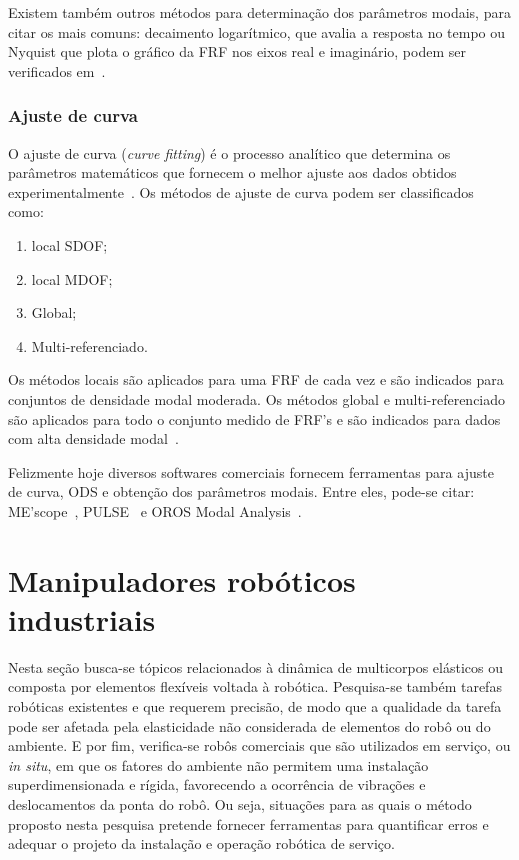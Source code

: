 Existem também outros métodos para determinação dos parâmetros modais, para
citar os mais comuns:
decaimento logarítmico, que avalia a resposta no tempo ou Nyquist que plota o
gráfico da FRF nos eixos real e imaginário, podem ser
verificados em~\cite{rao2011mechanical}.

\subsubsection{Ajuste de curva}

O ajuste de curva (\textit{curve fitting}) é o processo analítico que determina
os parâmetros matemáticos que fornecem o melhor ajuste aos dados
obtidos experimentalmente~\cite{dossing1988structural}.
Os métodos de ajuste de curva podem ser classificados como: 
%
\begin{enumerate}[label=\emph{\alph*})]
	\item local SDOF;
	\item local MDOF;
	\item Global;
	\item Multi-referenciado.
\end{enumerate}
%
Os métodos locais são aplicados para uma FRF de cada vez e são indicados para
conjuntos de densidade modal moderada. Os métodos global e multi-referenciado
são aplicados para todo o conjunto medido de FRF's e são indicados para dados
com alta densidade modal~\cite{schwarz1999experimental}. 

Felizmente hoje diversos softwares comerciais fornecem ferramentas para ajuste
de curva, ODS e obtenção dos parâmetros modais. Entre eles, pode-se citar:
ME'scope~\cite{mescope}, PULSE~\cite{pulse} e OROS Modal Analysis~\cite{oros}. 


\section{Manipuladores robóticos industriais}\label{sec::manind}
Nesta seção busca-se tópicos relacionados à dinâmica de multicorpos elásticos ou
composta por elementos flexíveis voltada à robótica. Pesquisa-se também tarefas
robóticas existentes e que requerem precisão, de modo que a qualidade da tarefa
pode ser afetada pela elasticidade não considerada de elementos do robô ou do
ambiente.
E por fim, verifica-se robôs comerciais que são utilizados em serviço, ou
\textit{in situ}, em que os fatores do ambiente não permitem uma instalação
superdimensionada e rígida, favorecendo a ocorrência de vibrações e
deslocamentos da ponta do robô. Ou seja, situações para as quais o método
proposto nesta pesquisa pretende fornecer ferramentas para quantificar erros e
adequar o projeto da instalação e operação robótica de serviço.

